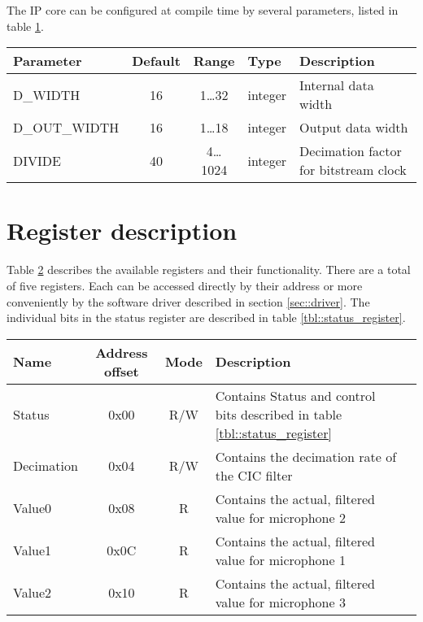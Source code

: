 The IP core can be configured at compile time by several parameters, listed in table \ref{tbl::parameters}.
\begin{table}[h]
	\centering
	\label{tbl::parameters}
	\begin{tabular}{|l|c|c|l|l|}
		\hline 
		Parameter & Default & Range & Type & Description \\ 
		\hline 
		D\_WIDTH & 16 & 1\ldots32 & integer & Internal data width \\
		\hline 
		D\_OUT\_WIDTH & 16 & 1\ldots18 & integer & Output data width \\
		\hline 
		DIVIDE & 40 & 4\ldots1024 & integer & Decimation factor for bitstream clock \\
		\hline 
	\end{tabular} 
\end{table}

\newpage

\section{Register description}
\label{sec::registers}
Table \ref{tbl::register_space} describes the available registers and their functionality.
There are a total of five registers.
Each can be accessed directly by their address or more conveniently by the software driver described in section \ref{sec::driver}.
The individual bits in the status register are described in table  \ref{tbl::status_register}.

\begin{table}[h]
	\centering
	\label{tbl::register_space}
	\begin{tabular}{|l|c|c|l|l|}
		\hline 
		Name & Address offset & Mode & Description \\
		\hline 
		Status & 0x00 & R/W & Contains Status and control bits described in table \ref{tbl::status_register} \\
		\hline 
		Decimation & 0x04 & R/W & Contains the decimation rate of the CIC filter \\
		\hline 
		Value0 & 0x08 & R & Contains the actual, filtered value for microphone 2 \\
		\hline 
		Value1 & 0x0C & R & Contains the actual, filtered value for microphone 1 \\
		\hline 
		Value2 & 0x10 & R & Contains the actual, filtered value for microphone 3 \\
		\hline 
	\end{tabular} 
\end{table}

